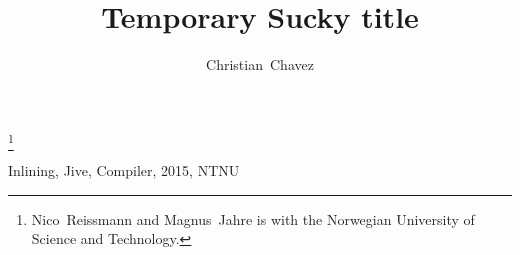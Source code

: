 \documentclass[journal]{IEEEtran}
\begin{document}
\title{Temporary Sucky title}
\author{Christian~Chavez}
\thanks{Nico~Reissmann and Magnus~Jahre is with the Norwegian University of Science and Technology.}

\maketitle

\begin{IEEEkeywords}
Inlining, Jive, Compiler, 2015, NTNU
\end{IEEEkeywords}
\IEEEpeerreviewmaketitle












\end{document}
